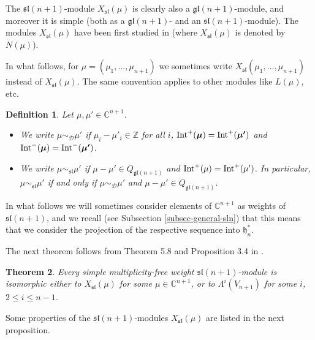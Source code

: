 \documentclass[12pt]{amsart}
\newcommand{\C}{{\mathbb C}}
\newcommand{\Z}{{\mathbb Z}}
\def\gh{\mathfrak{h}}
\def\Z{\mathbb{Z}}
\def\gh{\mathfrak h}
\newtheorem{thm}{Theorem}[section]
\newtheorem{defn}[thm]{Definition}
\begin{document}
The $\mathfrak{sl}({n+1})$-module $X_{\mathfrak{sl}}(\mu)$ is clearly also a $\mathfrak{gl}({n+1})$-module, and moreover it is simple (both as a $\mathfrak{gl}(n+1)$- and an $\mathfrak{sl}(n+1)$-module). The modules $X_{\mathfrak{sl}}(\mu)$ have been first studied in \cite{BBL} (where $X_{\mathfrak{sl}}(\mu)$ is denoted by $N(\mu)$). 

In what follows,  for $\mu = (\mu_1,...,\mu_{n+1})$ we sometimes write $X_{\mathfrak{sl}}(\mu_1,...,\mu_{n+1})$ instead of $X_{\mathfrak{sl}}(\mu)$. The same convention applies to other  modules like $L(\mu)$,  etc. 


\begin{defn}
Let $\mu, \mu' \in \C^{n+1}$.
\begin{itemize}
 \item[(i)]  We write $\mu  \sim_{\mathcal D} \mu'$ if $\mu_i - \mu'_i \in \Z$ for all $i$, ${\rm Int}^+ (\boldsymbol{\mu}) = {\rm Int}^+ (\boldsymbol{\mu'})$ and ${\rm Int}^- (\boldsymbol{\mu}) = {\rm Int}^- (\boldsymbol{\mu'})$.
 \item[(ii)] We write $\mu \sim_{\mathfrak{sl}} \mu'$ if  $\mu - \mu' \in Q_{\mathfrak{gl}(n+1)}$ and ${\rm Int}^+ (\mu) = {\rm Int}^+ (\mu')$. In particular, $\mu \sim_{\mathfrak{sl}} \mu'$ if and only if $\mu  \sim_{\mathcal D} \mu'$ and $\mu - \mu' \in Q_{\mathfrak{gl}(n+1)}$.
 \end{itemize}
\end{defn}

In what follows we will sometimes consider elements of ${\mathbb C}^{n+1}$ as weights of $\mathfrak{sl} (n+1)$, and we recall 
 (see Subsection \ref{subsec-general-sln}) that this means that we consider the projection of the respective sequence into $\gh_n^*$.



The next theorem follows from Theorem 5.8 and Proposition 3.4 in \cite{BBL}.
\begin{thm} \label{thm-bounded-finite}
Every simple multiplicity-free weight $\mathfrak{sl}({n+1})$-module is isomorphic either to $X_{\mathfrak{sl}}(\mu)$ for some $\mu \in \C^{n+1}$, or to $\Lambda^i(V_{n+1})$ for some $i$, $2\leq i \leq n-1$.
\end{thm}


Some properties of the $\mathfrak{sl}({n+1})$-modules  $X_{\mathfrak{sl}}(\mu)$ are listed in the next proposition.
\end{document}
